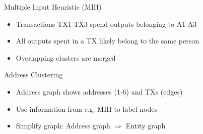 \begin{frame}{Multiple Input Heuristic (MIH)}\label{sec:mih}
	\resizebox{\textwidth}{!}{}
	\begin{itemize}[<+->] %
 		\item Transactions TX1-TX3 spend outputs belonging to A1-A3
		\item All outputs spent in a TX likely belong to the same person
		\item Overlapping clusters are merged
	\end{itemize}
\end{frame}
\begin{frame}{Address Clustering}
	\resizebox{\textwidth}{!}{}
	\begin{itemize}[<+->] %
	\item Address graph shows addresses (1-6) and TXs (edges)
	\item Use information from e.g. MIH to label nodes
	\item Simplify graph: Address graph $\Rightarrow$ Entity graph
	\end{itemize}
\end{frame}


% 
